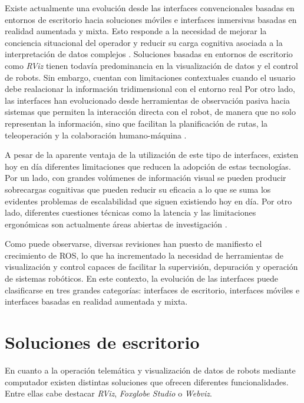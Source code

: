 Existe actualmente una evolución desde las interfaces convencionales basadas en entornos de escritorio hacia soluciones móviles e interfaces
inmersivas basadas en realidad aumentada y mixta. Esto responde a la necesidad de mejorar la conciencia situacional del operador y reducir 
su carga cognitiva asociada a la interpretación de datos complejos \parencite{9701489, ZEA2021100057}.
Soluciones basadas en entornos de escritorio como \textit{RViz} tienen todavía predominancia en la visualización de datos y el control de robots.
Sin embargo, cuentan con limitaciones contextuales cuando el usuario debe realacionar la información tridimensional con el entorno real \parencite{9701489, ZEA2021100057}
Por otro lado, las interfaces han evolucionado desde herramientas de observación pasiva hacia sistemas que permiten la interacción 
directa con el robot, de manera que no solo representan la información, sino que facilitan la planificación de rutas, la teleoperación y la 
colaboración humano-máquina \parencite{nevesetal, 10.1145/3610978.3640571, 9701489}.

A pesar de la aparente ventaja de la utilización de este tipo de interfaces, existen hoy en día diferentes limitaciones que reducen 
la adopción de estas tecnologías. Por un lado, con grandes volúmenes de información visual se pueden producir sobrecargas cognitivas
que pueden reducir su eficacia a lo que se suma los evidentes problemas de escalabilidad que siguen existiendo hoy en día. Por otro lado,
diferentes cuestiones técnicas como la latencia y las limitaciones ergonómicas son actualmente áreas abiertas de investigación 
\parencite{nevesetal, 10.1145/3708468.3715687, richardsetal}.

Como puede observarse, diversas revisiones han puesto de manifiesto el crecimiento de ROS, lo que ha incrementado
la necesidad de herramientas de visualización y control capaces de facilitar la supervisión, depuración y operación 
de sistemas robóticos. En este contexto, la evolución de las interfaces puede clasificarse en tres grandes categorías:
interfaces de escritorio, interfaces móviles e interfaces basadas en realidad aumentada y mixta.

\section{Soluciones de escritorio}
En cuanto a la operación telemática y visualización de datos 
de robots mediante computador existen 
distintas soluciones que ofrecen diferentes funcionalidades. Entre ellas 
cabe destacar \textit{RViz}, \textit{Foxglobe Studio} o \textit{Webviz}.

